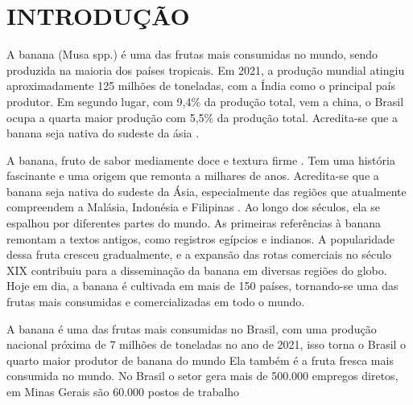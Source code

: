 \chapter{INTRODUÇÃO}

 A banana (Musa spp.) é uma das frutas mais consumidas no mundo, sendo produzida na maioria dos países tropicais. Em 2021, a produção mundial atingiu aproximadamente 125 milhões de toneladas, com a Índia como o principal país produtor. Em segundo lugar, com 9,4\% da produção total, vem a china, o Brasil ocupa a quarta maior produção com 5,5\% da produção total. Acredita-se que a banana seja nativa do sudeste da ásia \cite{1956TaOo}.

A banana, fruto de sabor mediamente doce e textura firme \cite{MATSUURA2004}. Tem uma história fascinante e uma origem que remonta a milhares de anos. Acredita-se que a banana seja nativa do sudeste da Ásia, especialmente das regiões que atualmente compreendem a Malásia, Indonésia e Filipinas \cite{1956TaOo}. Ao longo dos séculos, ela se espalhou por diferentes partes do mundo. As primeiras referências à banana remontam a textos antigos, como registros egípcios e indianos. A popularidade dessa fruta cresceu gradualmente, e a expansão das rotas comerciais no século XIX contribuiu para a disseminação da banana em diversas regiões do globo. Hoje em dia, a banana é cultivada em mais de 150 países, tornando-se uma das frutas mais consumidas e comercializadas em todo o mundo.

A banana é uma das frutas mais consumidas no Brasil, com uma produção nacional próxima de 7 milhões de toneladas no ano de 2021, isso torna o Brasil o quarto maior produtor de banana do mundo \cite{banana} Ela também é a fruta fresca mais consumida no mundo. No Brasil o setor gera mais de 500.000 empregos diretos, em Minas Gerais são 60.000 postos de trabalho